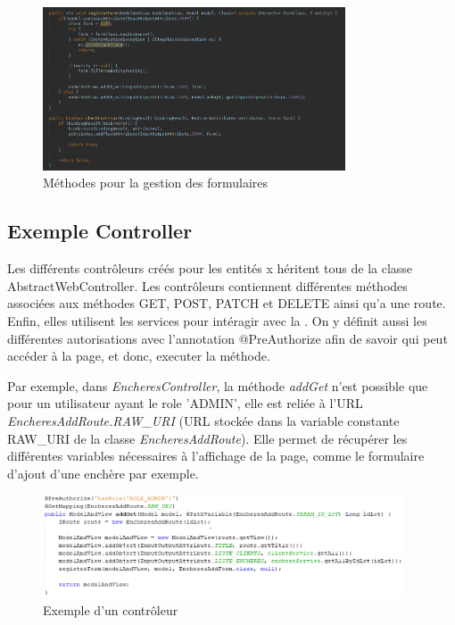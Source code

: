 			\begin{figure}[H]
				\centering\includegraphics[width=0.80\textwidth, keepaspectratio]{res/AbstractWebController-form.png}
				\caption{Méthodes pour la gestion des formulaires}
			\end{figure}

		\subsection{Exemple Controller}

		Les différents contrôleurs créés pour les entités x héritent tous de la classe AbstractWebController. \newline
		Les contrôleurs contiennent différentes méthodes associées aux méthodes GET, POST, PATCH et DELETE ainsi qu'a une route. Enfin, elles utilisent les services pour intéragir avec la \bdd{}. On y définit aussi les différentes autorisations avec l'annotation @PreAuthorize afin de savoir qui peut accéder à la page, et donc, executer la méthode.

		\noindent
		Par exemple, dans \textit{EncheresController}, la méthode \textit{addGet} n'est possible que pour un utilisateur ayant le role 'ADMIN', elle est reliée à l'URL \textit{EncheresAddRoute.RAW\_URI} (URL stockée dans la variable constante RAW\_URI de la classe \textit{EncheresAddRoute}). Elle permet de récupérer les différentes variables nécessaires à l'affichage de la page, comme le formulaire d'ajout d'une enchère par exemple.

		\begin{figure}[H]
			\centering\includegraphics[width=0.95\textwidth, keepaspectratio]{res/enchereController.png}
			\caption{Exemple d'un contrôleur}
		\end{figure}
